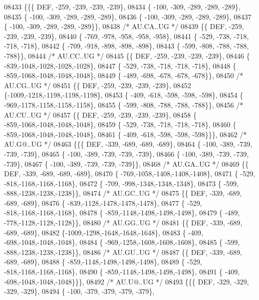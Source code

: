 \begin{DoxyCode}
08433 \{\{\{  DEF, -259, -239, -239, -239\},
08434 \{ -100, -309, -289, -289, -289\},
08435 \{ -100, -309, -289, -289, -289\},
08436 \{ -100, -309, -289, -289, -289\},
08437 \{ -100, -309, -289, -289, -289\}\},
08438 \textcolor{comment}{/* AU.CA..UG */}
08439 \{\{  DEF, -259, -239, -239, -239\},
08440 \{ -769, -978, -958, -958, -958\},
08441 \{ -529, -738, -718, -718, -718\},
08442 \{ -709, -918, -898, -898, -898\},
08443 \{ -599, -808, -788, -788, -788\}\},
08444 \textcolor{comment}{/* AU.CC..UG */}
08445 \{\{  DEF, -259, -239, -239, -239\},
08446 \{ -839,-1048,-1028,-1028,-1028\},
08447 \{ -529, -738, -718, -718, -718\},
08448 \{ -859,-1068,-1048,-1048,-1048\},
08449 \{ -489, -698, -678, -678, -678\}\},
08450 \textcolor{comment}{/* AU.CG..UG */}
08451 \{\{  DEF, -259, -239, -239, -239\},
08452 \{-1009,-1218,-1198,-1198,-1198\},
08453 \{ -409, -618, -598, -598, -598\},
08454 \{ -969,-1178,-1158,-1158,-1158\},
08455 \{ -599, -808, -788, -788, -788\}\},
08456 \textcolor{comment}{/* AU.CU..UG */}
08457 \{\{  DEF, -259, -239, -239, -239\},
08458 \{ -859,-1068,-1048,-1048,-1048\},
08459 \{ -529, -738, -718, -718, -718\},
08460 \{ -859,-1068,-1048,-1048,-1048\},
08461 \{ -409, -618, -598, -598, -598\}\}\},
08462 \textcolor{comment}{/* AU.G@..UG */}
08463 \{\{\{  DEF, -339, -689, -689, -689\},
08464 \{ -100, -389, -739, -739, -739\},
08465 \{ -100, -389, -739, -739, -739\},
08466 \{ -100, -389, -739, -739, -739\},
08467 \{ -100, -389, -739, -739, -739\}\},
08468 \textcolor{comment}{/* AU.GA..UG */}
08469 \{\{  DEF, -339, -689, -689, -689\},
08470 \{ -769,-1058,-1408,-1408,-1408\},
08471 \{ -529, -818,-1168,-1168,-1168\},
08472 \{ -709, -998,-1348,-1348,-1348\},
08473 \{ -599, -888,-1238,-1238,-1238\}\},
08474 \textcolor{comment}{/* AU.GC..UG */}
08475 \{\{  DEF, -339, -689, -689, -689\},
08476 \{ -839,-1128,-1478,-1478,-1478\},
08477 \{ -529, -818,-1168,-1168,-1168\},
08478 \{ -859,-1148,-1498,-1498,-1498\},
08479 \{ -489, -778,-1128,-1128,-1128\}\},
08480 \textcolor{comment}{/* AU.GG..UG */}
08481 \{\{  DEF, -339, -689, -689, -689\},
08482 \{-1009,-1298,-1648,-1648,-1648\},
08483 \{ -409, -698,-1048,-1048,-1048\},
08484 \{ -969,-1258,-1608,-1608,-1608\},
08485 \{ -599, -888,-1238,-1238,-1238\}\},
08486 \textcolor{comment}{/* AU.GU..UG */}
08487 \{\{  DEF, -339, -689, -689, -689\},
08488 \{ -859,-1148,-1498,-1498,-1498\},
08489 \{ -529, -818,-1168,-1168,-1168\},
08490 \{ -859,-1148,-1498,-1498,-1498\},
08491 \{ -409, -698,-1048,-1048,-1048\}\}\},
08492 \textcolor{comment}{/* AU.U@..UG */}
08493 \{\{\{  DEF, -329, -329, -329, -329\},
08494 \{ -100, -379, -379, -379, -379\},

\end{DoxyCode}
